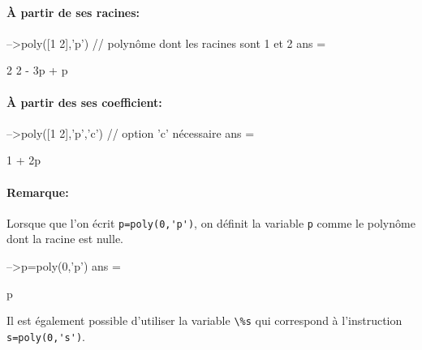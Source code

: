 \paragraph{\`A partir de ses racines:}
\begin{Scilabcode}
-->poly([1 2],'p')    // polynôme dont les racines sont 1 et 2
 ans  =
 
              2  
    2 - 3p + p 
\end{Scilabcode}
\paragraph{\`A partir des ses coefficient:}
\begin{Scilabcode}
-->poly([1 2],'p','c')    // option 'c' nécessaire
 ans  =
 
    1 + 2p
\end{Scilabcode}
\paragraph{Remarque:}
Lorsque que l'on écrit \verb?p=poly(0,'p')?, on définit la variable \verb?p? 
comme le polynôme dont la racine est nulle.
\begin{Scilabcode}
-->p=poly(0,'p')
 ans  =

    p
\end{Scilabcode}
Il est également possible d'utiliser la variable \verb?\%s? qui correspond
à l'instruction \verb?s=poly(0,'s')?.
